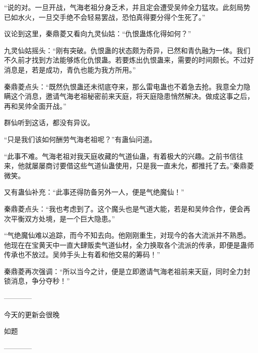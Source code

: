 \begin{this_body}
“说的对。一旦开战，气海老祖分身乏术，并且定会遭受吴帅全力猛攻。此刻局势已如水火，一旦交手绝不会轻易罢战，恐怕真得要分得个生死了。”

议论到这里，秦鼎菱又看向九灵仙姑：“仇恨蛊炼化得如何？”

九灵仙姑摇头：“刚有突破。仇恨蛊的状态颇为奇异，已然和青仇融为一体。我们不久前才找到方法能够炼化仇恨蛊。若要炼出仇恨蛊来，需要的时间颇长。不过好消息是，若是成功，青仇也能为我方所用。”

秦鼎菱点头：“既然仇恨蛊还未彻底夺来，那么雷电蛊也不着急去抢。我意全力隐瞒这个消息，邀请气海老祖秘密前来天庭，将天庭隐患悄然解决。做成这事之后，再和吴帅全面开战。”

群仙听到这话，都没有异议。

“只是我们该如何酬劳气海老祖呢？”有蛊仙问道。

“此事不难。气海老祖对我天庭收藏的气道仙蛊，有着极大的兴趣。之前书信往来，他就屡屡商讨要借这些气道仙蛊使用，只是我一直未允，都推托了去。”秦鼎菱微笑。

又有蛊仙补充：“此事还得防备另外一人，便是气绝魔仙！”

秦鼎菱点头：“我也考虑到了。这个魔头也是气道大能，若是和吴帅合作，便会再次平衡双方处境，是一个巨大隐患。”

“气绝魔仙难以追踪，而今不知去向。他刚刚重生，对现今的各大流派并不熟悉。他现在在宝黄天中一直大肆贩卖气道仙材，全力换取各个流派的传承，即便是蛊师传承也不放过。吴帅手头上有着和他交易的筹码！”

秦鼎菱再次强调：“所以当今之计，便是立即邀请气海老祖前来天庭，同时全力封锁消息，争分夺秒！”

------------

今天的更新会很晚

如题

------------

\end{this_body}

